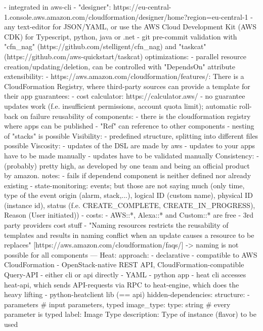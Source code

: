     - integrated in aws-cli
    - "designer": https://eu-central-1.console.aws.amazon.com/cloudformation/designer/home?region=eu-central-1
    - any text-editor for JSON/YAML, or use the AWS Cloud Development Kit (AWS CDK) for Typescript, python, java or .net
    - git pre-commit validation with "cfn_nag" (https://github.com/stelligent/cfn_nag) and "taskcat" (https://github.com/aws-quickstart/taskcat)
  optimizations:
    - parallel resource creation/updating/deletion, can be controlled with "DependsOn" attribute
  extensibility:
    - https://aws.amazon.com/cloudformation/features/: There is a CloudFormation Registry, where third-party sources can provide a template for their app
  guarantees:
    - cost calculator: https://calculator.aws/
    - no guarantee updates work (f.e. insufficient permissions, account quota limit); automatic roll-back on failure
  reusability of components:
    - there is the cloudformation registry where apps can be published
    - "Ref" can reference to other components
    - nesting of "stacks" is possible
  Visibility:
    - predefined structure, splitting into different files possible
  Viscosity:
    - updates of the DSL are made by aws
    - updates to your apps have to be made manually
    - updates have to be validated manually
  Consistency:
    - (probably) pretty high, as developed by one team and being an official product by amazon.
  notes:
    - fails if dependend component is neither defined nor already existing
    - state-monitoring: events; but those are not saying much (only time, type of the event origin (alarm, stack,...), logical ID (custom name), physical ID (instance id), status (f.e. CREATE_COMPLETE, CREATE_IN_PROGRESS), Reason (User initiated))
    - costs:
      - AWS::*, Alexa::* and Custom::* are free
      - 3rd party providers cost stuff
    - "Naming resources restricts the reusability of templates and results in naming conflict when an update causes a resource to be replaces" [https://aws.amazon.com/cloudformation/faqs/] -> naming is not possible for all components
---
Heat:
  approach:
    - declarative
    - compatible to AWS CloudFormation
    - OpenStack-native REST API, CloudFormation-compatible Query-API
    - either cli or api directly
    - YAML
    - python app
    - heat cli accesses heat-api, which sends API-requests via RPC to heat-engine, which does the heavy lifting
    - python-heatclient lib (== api)
  hidden-dependencies:
  structure:
    - parameters # input parameters, typed
        image_type:
          type: string # every parameter is typed
          label: Image Type
          description: Type of instance (flavor) to be used
